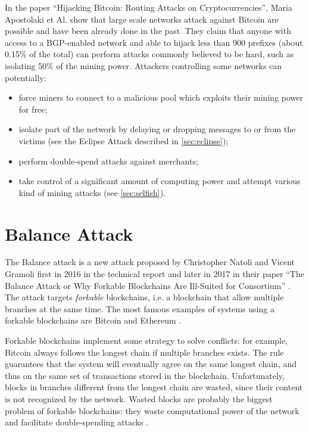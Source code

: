 \medskip
In the paper ``Hijacking Bitcoin: Routing Attacks on Cryptocurrencies'', Maria Apostolaki et Al. show that large scale networks attack against Bitcoin are possible and have been already done in the past.
They claim that anyone with access to a BGP-enabled network and able to hijack less than \num{900} prefixes (about \num{0.15}\% of the total) can perform attacks commonly believed to be hard, such as isolating \num{50}\% of the mining power.
Attackers controlling some networks can potentially:
\begin{itemize}
	\item force miners to connect to a malicious pool which exploits their mining power for free;
	\item isolate part of the network by delaying or dropping messages to or from the victims (see the Eclipse Attack described in \cref{sec:eclipse});
	\item perform double-spend attacks against merchants;
	\item take control of a significant amount of computing power and attempt various kind of mining attacks (see \cref{sec:selfish}).
\end{itemize}


\section{Balance Attack}
\label{sec:balance}
The Balance attack is a new attack proposed by Christopher Natoli and Vicent Gramoli first in \num{2016} in the technical report \cite{balance_attack_report_2016} and later in \num{2017} in their paper ``The Balance Attack or Why Forkable Blockchains Are Ill-Suited for Consortium'' \cite{balance_attack_2017}.
The attack targets \textit{forkable} blockchains, i.e. a blockchain that allow multiple branches at the same time.
The most famous examples of systems using a forkable blockchains are Bitcoin \cite{bitcoin_2009} and Ethereum \cite{ethereum_2014}.

\medskip
Forkable blockchains implement some strategy to solve conflicts:
for example, Bitcoin always follows the longest chain if multiple branches exists.
The rule guarantees that the system will eventually agree on the same longest chain, and thus on the same set of transactions stored in the blockchain.
Unfortunately, blocks in branches different from the longest chain are wasted, since their content is not recognized by the network.
Wasted blocks are probably the biggest problem of forkable blockchains:
they waste computational power of the network and facilitate double-spending attacks \cite{double_spending_fast_analysis_2014}.

